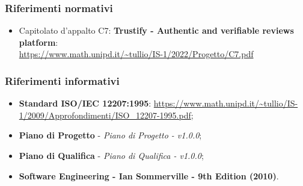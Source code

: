     \subsubsection{Riferimenti normativi}
        \begin{itemize}
            \item Capitolato d'appalto C7: \textbf{Trustify - Authentic and verifiable reviews platform}: \\
            \url{https://www.math.unipd.it/~tullio/IS-1/2022/Progetto/C7.pdf}
        \end{itemize}
    \subsubsection{Riferimenti informativi}
        \begin{itemize}
            \item \textbf{Standard ISO/IEC 12207:1995}: \url{https://www.math.unipd.it/~tullio/IS-1/2009/Approfondimenti/ISO_12207-1995.pdf};
            \item \textbf{Piano di Progetto} - \textit{Piano di Progetto - v1.0.0};
            \item \textbf{Piano di Qualifica} - \textit{Piano di Qualifica - v1.0.0};
            \item \textbf{Software Engineering - Ian Sommerville - 9th Edition (2010)}.
        \end{itemize}
